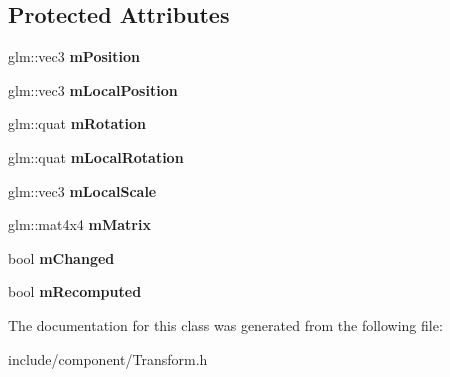 \subsection*{\-Protected \-Attributes}
\begin{DoxyCompactItemize}
\item 
\hypertarget{classde_1_1component_1_1_transform_a1a0d80838c02e57bc271516572784ee4}{
glm\-::vec3 {\bfseries m\-Position}}
\label{classde_1_1component_1_1_transform_a1a0d80838c02e57bc271516572784ee4}

\item 
\hypertarget{classde_1_1component_1_1_transform_a791f59c644c4af4d31ac000a61eb4716}{
glm\-::vec3 {\bfseries m\-Local\-Position}}
\label{classde_1_1component_1_1_transform_a791f59c644c4af4d31ac000a61eb4716}

\item 
\hypertarget{classde_1_1component_1_1_transform_acde4ad08f2bb859b01885b6133f43e53}{
glm\-::quat {\bfseries m\-Rotation}}
\label{classde_1_1component_1_1_transform_acde4ad08f2bb859b01885b6133f43e53}

\item 
\hypertarget{classde_1_1component_1_1_transform_ac4a7eecdbe7457b3331e26a4c9e4939b}{
glm\-::quat {\bfseries m\-Local\-Rotation}}
\label{classde_1_1component_1_1_transform_ac4a7eecdbe7457b3331e26a4c9e4939b}

\item 
\hypertarget{classde_1_1component_1_1_transform_a64bdb4a44b50f610c6fb34b13d74f65f}{
glm\-::vec3 {\bfseries m\-Local\-Scale}}
\label{classde_1_1component_1_1_transform_a64bdb4a44b50f610c6fb34b13d74f65f}

\item 
\hypertarget{classde_1_1component_1_1_transform_a46f0487729770e66da59ddc8df4fe02e}{
glm\-::mat4x4 {\bfseries m\-Matrix}}
\label{classde_1_1component_1_1_transform_a46f0487729770e66da59ddc8df4fe02e}

\item 
\hypertarget{classde_1_1component_1_1_transform_a8ec6eb4a7ec9b73e08f1b6e5bf7c1299}{
bool {\bfseries m\-Changed}}
\label{classde_1_1component_1_1_transform_a8ec6eb4a7ec9b73e08f1b6e5bf7c1299}

\item 
\hypertarget{classde_1_1component_1_1_transform_a8d1518abb22163f75fff74b98b814d19}{
bool {\bfseries m\-Recomputed}}
\label{classde_1_1component_1_1_transform_a8d1518abb22163f75fff74b98b814d19}

\end{DoxyCompactItemize}


\-The documentation for this class was generated from the following file\-:\begin{DoxyCompactItemize}
\item 
include/component/\-Transform.\-h\end{DoxyCompactItemize}
